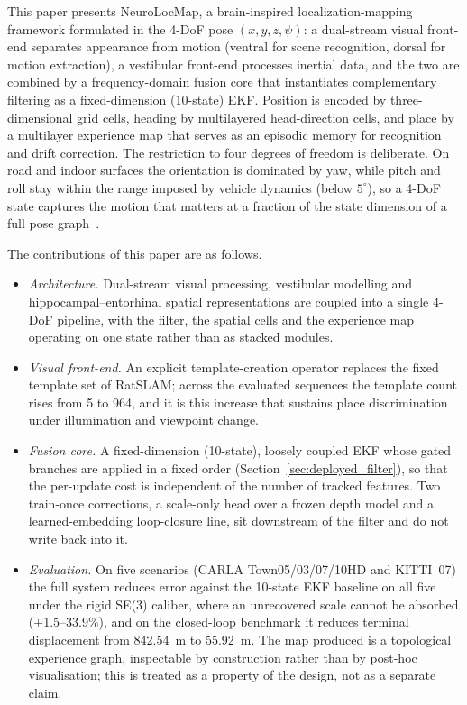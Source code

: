 \documentclass[review,12pt]{elsarticle}
\begin{document}
This paper presents NeuroLocMap, a brain-inspired localization-mapping framework formulated in the 4-DoF pose $(x,y,z,\psi)$: a dual-stream visual front-end separates appearance from motion (ventral for scene recognition, dorsal for motion extraction), a vestibular front-end processes inertial data, and the two are combined by a frequency-domain fusion core that instantiates complementary filtering as a fixed-dimension (10-state) EKF. Position is encoded by three-dimensional grid cells, heading by multilayered head-direction cells, and place by a multilayer experience map that serves as an episodic memory for recognition and drift correction. The restriction to four degrees of freedom is deliberate. On road and indoor surfaces the orientation is dominated by yaw, while pitch and roll stay within the range imposed by vehicle dynamics (below $5^\circ$), so a 4-DoF state captures the motion that matters at a fraction of the state dimension of a full pose graph~\cite{milford2004ratslam,milford2010persistent}.

The contributions of this paper are as follows.
\begin{itemize}
    \item \emph{Architecture.} Dual-stream visual processing, vestibular modelling and hippocampal--entorhinal spatial representations are coupled into a single 4-DoF pipeline, with the filter, the spatial cells and the experience map operating on one state rather than as stacked modules.
    \item \emph{Visual front-end.} An explicit template-creation operator replaces the fixed template set of RatSLAM; across the evaluated sequences the template count rises from 5 to 964, and it is this increase that sustains place discrimination under illumination and viewpoint change.
    \item \emph{Fusion core.} A fixed-dimension (10-state), loosely coupled EKF whose gated branches are applied in a fixed order (Section~\ref{sec:deployed_filter}), so that the per-update cost is independent of the number of tracked features. Two train-once corrections, a scale-only head over a frozen depth model and a learned-embedding loop-closure line, sit downstream of the filter and do not write back into it.
    \item \emph{Evaluation.} On five scenarios (CARLA Town05/03/07/10HD and KITTI~07) the full system reduces error against the 10-state EKF baseline on all five under the rigid SE(3) caliber, where an unrecovered scale cannot be absorbed ($+$1.5--33.9\%), and on the closed-loop benchmark it reduces terminal displacement from 842.54~m to 55.92~m. The map produced is a topological experience graph, inspectable by construction rather than by post-hoc visualisation; this is treated as a property of the design, not as a separate claim.
\end{itemize}
\end{document}
